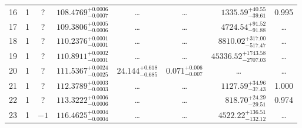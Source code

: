 \begin{table*}[!]
\begin{tabular}{llcrrlrc}
16 & 1 & ? & $    108.4769_{-      0.0007}^{+      0.0006}$ & \multicolumn{1}{c}{\dots} & \multicolumn{1}{c}{\dots} & $     1335.59_{-       39.61}^{+       40.55}$ & 0.995\\[1pt]
17 & 1 & ? & $    109.3806_{-      0.0006}^{+      0.0005}$ & \multicolumn{1}{c}{\dots} & \multicolumn{1}{c}{\dots} & $     4724.54_{-       91.88}^{+       91.52}$ & \dots \\[1pt]
18 & 1 & ? & $    110.2376_{-      0.0001}^{+      0.0001}$ & \multicolumn{1}{c}{\dots} & \multicolumn{1}{c}{\dots} & $     8810.02_{-      517.47}^{+      317.00}$ & \dots \\[1pt]
19 & 1 & ? & $    110.8911_{-      0.0001}^{+      0.0002}$ & \multicolumn{1}{c}{\dots} & \multicolumn{1}{c}{\dots} & $    45336.52_{-     2707.03}^{+     1743.58}$ & \dots \\[1pt]
20 & 1 & ? & $    111.5367_{-      0.0025}^{+      0.0024}$ & $      24.144_{-       0.685}^{+       0.618}$ & $       0.071_{-       0.007}^{+       0.006}$ & \multicolumn{1}{c}{\dots} & \dots \\[1pt]
21 & 1 & ? & $    112.3789_{-      0.0003}^{+      0.0003}$ & \multicolumn{1}{c}{\dots} & \multicolumn{1}{c}{\dots} & $     1127.59_{-       37.43}^{+       34.96}$ & 1.000\\[1pt]
22 & 1 & ? & $    113.3222_{-      0.0006}^{+      0.0006}$ & \multicolumn{1}{c}{\dots} & \multicolumn{1}{c}{\dots} & $      818.70_{-       29.51}^{+       24.29}$ & 0.974\\[1pt]
23 & 1 & $-1$ & $    116.4625_{-      0.0004}^{+      0.0004}$ & \multicolumn{1}{c}{\dots} & \multicolumn{1}{c}{\dots} & $     4522.22_{-      132.12}^{+      136.51}$ & \dots \\[1pt]


\end{tabular}
\end{table*}
